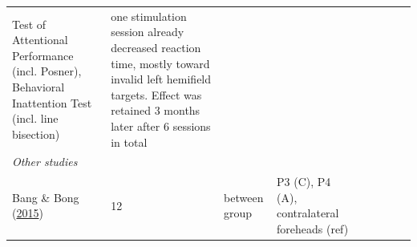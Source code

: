\documentclass[11pt,]{memoir}
\begin{document}
\begin{longtable}[]{@{}lllllllll@{}}
\begin{minipage}[t]{0.15\columnwidth}
Test of Attentional Performance
(incl. Posner), Behavioral
Inattention Test (incl. line
bisection)\strut
\end{minipage} & \begin{minipage}[t]{0.24\columnwidth}\raggedright
one stimulation session already decreased reaction time,
mostly toward invalid left hemifield targets. Effect was
retained 3 months later after 6 sessions in total\strut
\end{minipage}\tabularnewline
\begin{minipage}[t]{0.09\columnwidth}\raggedright
\emph{Other studies}\strut
\end{minipage} & \begin{minipage}[t]{0.02\columnwidth}\raggedright
\strut
\end{minipage} & \begin{minipage}[t]{0.04\columnwidth}\raggedright
\strut
\end{minipage} & \begin{minipage}[t]{0.10\columnwidth}\raggedright
\strut
\end{minipage} & \begin{minipage}[t]{0.03\columnwidth}\raggedright
\strut
\end{minipage} & \begin{minipage}[t]{0.05\columnwidth}\raggedright
\strut
\end{minipage} & \begin{minipage}[t]{0.04\columnwidth}\raggedright
\strut
\end{minipage} & \begin{minipage}[t]{0.15\columnwidth}\raggedright
\strut
\end{minipage} & \begin{minipage}[t]{0.24\columnwidth}\raggedright
\strut
\end{minipage}\tabularnewline
\begin{minipage}[t]{0.09\columnwidth}\raggedright
Bang \& Bong (\protect\hyperlink{ref-Bang2015}{2015})\strut
\end{minipage} & \begin{minipage}[t]{0.02\columnwidth}\raggedright
12\strut
\end{minipage} & \begin{minipage}[t]{0.04\columnwidth}\raggedright
between
group\strut
\end{minipage} & \begin{minipage}[t]{0.10\columnwidth}\raggedright
P3 (C), P4 (A),
contralateral foreheads
(ref)\strut
\end{minipage} & \begin{minipage}[t]{0.03\columnwidth}\raggedright

\end{minipage}
\end{longtable}
\end{document}
